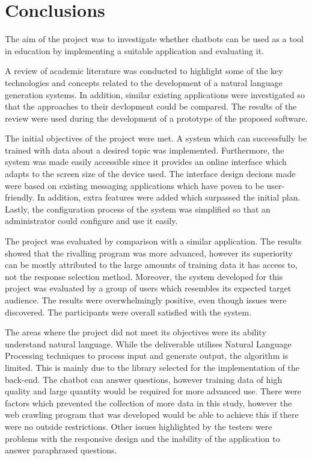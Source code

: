 \documentclass[12pt,a4paper]{article}
\begin{document}
\newpage
\section{Conclusions}
The aim of the project was to investigate whether chatbots can be used as a tool in education by implementing a suitable application and evaluating it.

A review of academic literature was conducted to highlight some of the key technologies and concepts related to the development of a natural language generation systems. In addition, similar existing applications were investigated so that the approaches to their devlopment could be compared. The results of the review were used during the development of a prototype of the proposed software.

The initial objectives of the project were met. A system which can successfully be trained with data about a desired topic was implemented. Furthermore, the system was made easily accessible since it provides an online interface which adapts to the screen size of the device used. The interface design decions made were based on existing messaging applications which have poven to be user-friendly. In addition, extra features were added which surpassed the initial plan. Lastly, the configuration process of the system was simplified so that an administrator could configure and use it easily.

The project was evaluated by comparison with a similar application. The results showed that the rivalling program was more advanced, however its superiority can be mostly attributed to the large amounts of training data it has access to, not the response selection method. Moreover, the system developed for this project was evaluated by a group of users which resembles its expected target audience. The results were overwhelmingly positive, even though issues were discovered. The participants were overall satisfied with the system.

The areas where the project did not meet its objectives were its ability understand natural language. While the deliverable utilises Natural Language Processing techniques to process input and generate output, the algorithm is limited. This is mainly due to the library selected for the implementation of the back-end. The chatbot can answer questions, however training data of high quality and large quantity would be required for more advanced use. There were factors which prevented the collection of more data in this study, however the web crawling program that was developed would be able to achieve this if there were no outside restrictions. Other issues highlighted by the testers were problems with the responsive design and the inability of the application to answer paraphrased questions.
\end{document}
